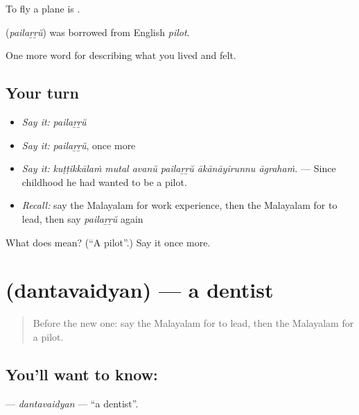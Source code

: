 To fly a plane is  .

\begin{cousinweb}
\textbf{} (\emph{pailaṟṟŭ}) was borrowed from English \emph{pilot}.
\end{cousinweb}

\begin{grammarlens}[title={What you've built}]
One more word for describing what you lived and felt.
\end{grammarlens}

\subsection*{Your turn}
\begin{itemize}
\raggedright
  \item \emph{Say it:} \emph{pailaṟṟŭ}
  \item \emph{Say it:} \emph{pailaṟṟŭ}, once more
  \item \emph{Say it:} \emph{kuṭṭikkālaṁ mutal avanŭ pailaṟṟŭ ākānāyirunnu āgrahaṁ.} — Since childhood he had wanted to be a pilot.
  \item \emph{Recall:} say the Malayalam for work experience, then the Malayalam for to lead, then say \emph{pailaṟṟŭ} again
\end{itemize}

\begin{tcolorbox}[breakable,colback=teal!4,colframe=teal!35!black,title={Before you move on}]
What does  mean? (\textquotedblleft{}A pilot\textquotedblright{}.) Say it once more.
\end{tcolorbox}
\section[\texorpdfstring{\ml{ദന്തവൈദ്യൻ} (dantavaidyan)}{ദന്തവൈദ്യൻ (dantavaidyan)}]{ (dantavaidyan) — a dentist}

\label{lesson:ML-C547-dantavaidyan}



\begin{quote}
Before the new one: say the Malayalam for to lead, then the Malayalam for a pilot.
\end{quote}

\subsection*{You'll want to know: }
\textbf{} — \emph{dantavaidyan} — \textquotedblleft{}a dentist\textquotedblright{}.

